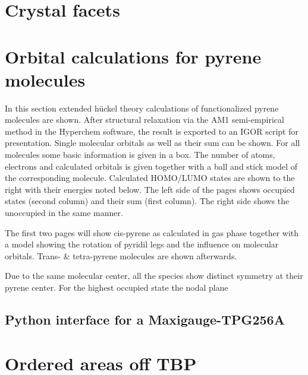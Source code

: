 \documentclass[
10pt,					%
a4paper,				%
twoside,				%
BCOR=8mm,				%
headings=normal,		%
headsepline,			%
footsepline,			%
plainfootsepline,		%
]{scrbook}
\begin{document}
\section{Crystal facets}
  
\section{Orbital calculations for pyrene molecules}
In this section extended hückel theory calculations of functionalized pyrene molecules are shown. After structural relaxation via the AM1 semi-empirical method in the Hyperchem software, the result is exported to an IGOR script for presentation. Single molecular orbitals as well as their sum can be shown. For all molecules some basic information is given in a box. The number of atoms, electrons and calculated orbitals is given together with a ball and stick model of the corresponding molecule. Calculated HOMO/LUMO states are shown to the right with their energies noted below.
The left side of the pages shows occupied states (second column) and their sum (first column). The right side shows the unoccupied in the same manner.

The first two pages will show cis-pyrene as calculated in gas phase together with a model showing the rotation of pyridil legs and the influence on molecular orbitals. Trans- \& tetra-pyrene molecules are shown afterwards.

Due to the same molecular center, all the species show distinct symmetry at their pyrene center. For the highest occupied state the nodal plane
%
%
  
  
  
  
\restoregeometry
  

%
\begin{landscape}
\section{Python interface for a Maxigauge-TPG256A}
\end{landscape}
\restoregeometry
 \section{Ordered areas off TBP}
 
\end{document}

